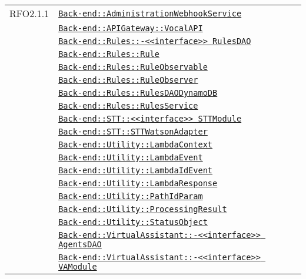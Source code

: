 \begin{longtable}{|>{\centering}m{3cm}|m{10cm}<{\centering}|}
RFO2.1.1 & \hyperref[Back-end::AdministrationWebhookService]{\texttt{Back-end::AdministrationWebhookService}}\\
& \hyperref[Back-end::APIGateway::VocalAPI]{\texttt{Back-end::APIGateway::VocalAPI}}\\
& \hyperref[Back-end::Rules::<<interface>> RulesDAO]{\texttt{Back-end::Rules::-\linebreak <<interface>> RulesDAO}}\\
& \hyperref[Back-end::Rules::Rule]{\texttt{Back-end::Rules::Rule}}\\
& \hyperref[Back-end::Rules::RuleObservable]{\texttt{Back-end::Rules::RuleObservable}}\\
& \hyperref[Back-end::Rules::RuleObserver]{\texttt{Back-end::Rules::RuleObserver}}\\
& \hyperref[Back-end::Rules::RulesDAODynamoDB]{\texttt{Back-end::Rules::RulesDAODynamoDB}}\\
& \hyperref[Back-end::Rules::RulesService]{\texttt{Back-end::Rules::RulesService}}\\
& \hyperref[Back-end::STT::<<interface>> STTModule]{\texttt{Back-end::STT::<<interface>> STTModule}}\\
& \hyperref[Back-end::STT::STTWatsonAdapter]{\texttt{Back-end::STT::STTWatsonAdapter}}\\
& \hyperref[Back-end::Utility::LambdaContext]{\texttt{Back-end::Utility::LambdaContext}}\\
& \hyperref[Back-end::Utility::LambdaEvent]{\texttt{Back-end::Utility::LambdaEvent}}\\
& \hyperref[Back-end::Utility::LambdaIdEvent]{\texttt{Back-end::Utility::LambdaIdEvent}}\\
& \hyperref[Back-end::Utility::LambdaResponse]{\texttt{Back-end::Utility::LambdaResponse}}\\
& \hyperref[Back-end::Utility::PathIdParam]{\texttt{Back-end::Utility::PathIdParam}}\\
& \hyperref[Back-end::Utility::ProcessingResult]{\texttt{Back-end::Utility::ProcessingResult}}\\
& \hyperref[Back-end::Utility::StatusObject]{\texttt{Back-end::Utility::StatusObject}}\\
& \hyperref[Back-end::VirtualAssistant::<<interface>> AgentsDAO]{\texttt{Back-end::VirtualAssistant::-\linebreak <<interface>> AgentsDAO}}\\
& \hyperref[Back-end::VirtualAssistant::<<interface>> VAModule]{\texttt{Back-end::VirtualAssistant::-\linebreak <<interface>> VAModule}}\\

\end{longtable}
